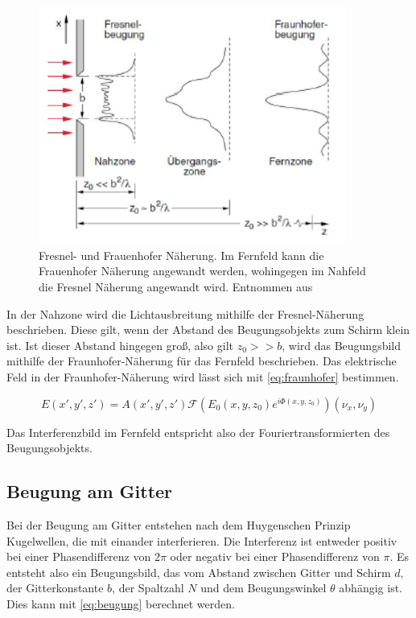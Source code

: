 \begin{figure}[h!]
	\centering
	\includegraphics[width=0.9\textwidth]{abstande.png}
	\caption{Fresnel- und Frauenhofer Näherung. Im Fernfeld kann die Frauenhofer Näherung angewandt werden, wohingegen im Nahfeld die Fresnel Näherung angewandt wird. Entnommen aus \cite[5]{anleitung-ws2014}}
	\label{Theoriebild}
\end{figure}

In der Nahzone wird die Lichtausbreitung mithilfe der Fresnel-Näherung beschrieben. Diese gilt, wenn der Abstand des Beugungsobjekts zum Schirm klein ist. Ist dieser Abstand hingegen groß, also gilt $z_0 >> b$, wird das Beugungsbild mithilfe der Fraunhofer-Näherung für das Fernfeld beschrieben. Das elektrische Feld in der Fraunhofer-Näherung wird lässt sich mit \cref{eq:fraunhofer} bestimmen.

\begin{equation}
E\left( x', y', z'\right) = A\left( x', y', z'\right) \mathcal{F}\left( E_0\left( x, y, z_0\right) e^{i\Phi\left( x, y, z_0\right) }\right) \left( \nu_x, \nu_y\right) 
\label{eq:fraunhofer}
\end{equation}

Das Interferenzbild im Fernfeld entspricht also der Fouriertransformierten des Beugungsobjekts.

\subsection{Beugung am Gitter}
Bei der Beugung am Gitter entstehen nach dem Huygenschen Prinzip Kugelwellen, die mit einander interferieren. Die Interferenz ist entweder positiv bei einer Phasendifferenz von $2\pi$ oder negativ bei einer Phasendifferenz von $\pi$. Es entsteht also ein Beugungsbild, das vom Abstand zwischen Gitter und Schirm $d$, der Gitterkonstante $b$, der Spaltzahl $N$ und dem Beugungswinkel $\theta$ abhängig ist. Dies kann mit \cref{eq:beugung} berechnet werden.

